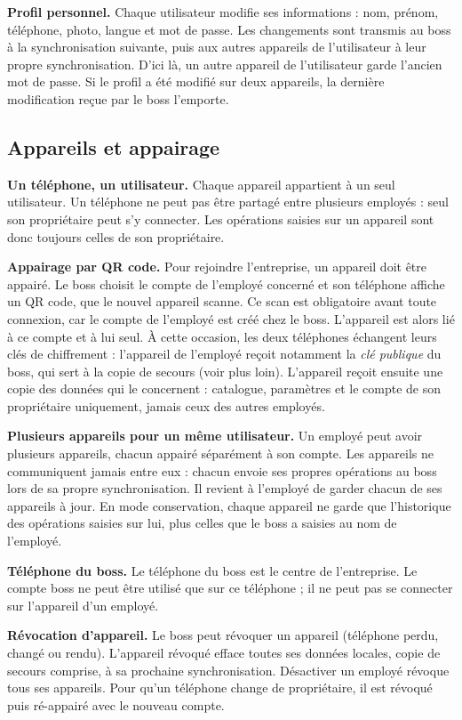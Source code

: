 \documentclass[11pt,a4paper]{article}
\newcommand{\fonc}[2]{\textbf{#1.} #2\par\vspace{0.2em}}
\begin{document}
	\fonc{Profil personnel}{Chaque utilisateur modifie ses informations : nom, prénom, téléphone, photo, langue et mot de passe. Les changements sont transmis au boss à la synchronisation suivante, puis aux autres appareils de l'utilisateur à leur propre synchronisation. D'ici là, un autre appareil de l'utilisateur garde l'ancien mot de passe. Si le profil a été modifié sur deux appareils, la dernière modification reçue par le boss l'emporte.}

	\subsection{Appareils et appairage}

	\fonc{Un téléphone, un utilisateur}{Chaque appareil appartient à un seul utilisateur. Un téléphone ne peut pas être partagé entre plusieurs employés : seul son propriétaire peut s'y connecter. Les opérations saisies sur un appareil sont donc toujours celles de son propriétaire.}

	\fonc{Appairage par QR code}{Pour rejoindre l'entreprise, un appareil doit être appairé. Le boss choisit le compte de l'employé concerné et son téléphone affiche un QR code, que le nouvel appareil scanne. Ce scan est obligatoire avant toute connexion, car le compte de l'employé est créé chez le boss. L'appareil est alors lié à ce compte et à lui seul. À cette occasion, les deux téléphones échangent leurs clés de chiffrement : l'appareil de l'employé reçoit notamment la \emph{clé publique} du boss, qui sert à la copie de secours (voir plus loin). L'appareil reçoit ensuite une copie des données qui le concernent : catalogue, paramètres et le compte de son propriétaire uniquement, jamais ceux des autres employés.}

	\fonc{Plusieurs appareils pour un même utilisateur}{Un employé peut avoir plusieurs appareils, chacun appairé séparément à son compte. Les appareils ne communiquent jamais entre eux : chacun envoie ses propres opérations au boss lors de sa propre synchronisation. Il revient à l'employé de garder chacun de ses appareils à jour. En mode conservation, chaque appareil ne garde que l'historique des opérations saisies sur lui, plus celles que le boss a saisies au nom de l'employé.}

	\fonc{Téléphone du boss}{Le téléphone du boss est le centre de l'entreprise. Le compte boss ne peut être utilisé que sur ce téléphone ; il ne peut pas se connecter sur l'appareil d'un employé.}

	\fonc{Révocation d'appareil}{Le boss peut révoquer un appareil (téléphone perdu, changé ou rendu). L'appareil révoqué efface toutes ses données locales, copie de secours comprise, à sa prochaine synchronisation. Désactiver un employé révoque tous ses appareils. Pour qu'un téléphone change de propriétaire, il est révoqué puis ré-appairé avec le nouveau compte.}
\end{document}

